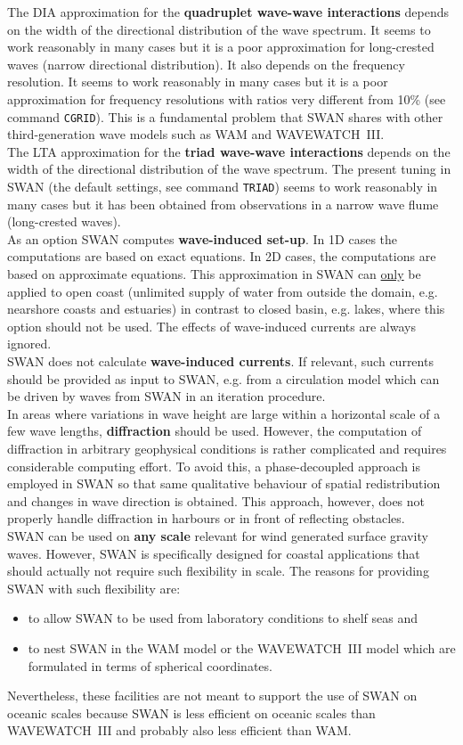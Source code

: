 \documentclass[12pt]{book}
\begin{document}
The DIA approximation for the {\bf quadruplet wave-wave interactions} depends on the width of the directional
distribution of the wave spectrum. It seems to work reasonably in many cases but it is a poor
approximation for long-crested waves (narrow directional distribution). It also depends on the frequency
resolution. It seems to work reasonably in many cases but it is a poor approximation for frequency
resolutions with ratios very different from 10\% (see command {\tt CGRID}). This is a fundamental problem
that SWAN shares with other third-generation wave models such as WAM and WAVEWATCH~III.
\\[2ex]
\noindent
The LTA approximation for the {\bf triad wave-wave interactions} depends on the width of the directional
distribution of the wave spectrum. The present tuning in SWAN (the default settings, see command
{\tt TRIAD}) seems to work reasonably in many cases but it has been obtained from observations in a narrow
wave flume (long-crested waves).
\\[2ex]
\noindent
As an option SWAN computes {\bf wave-induced set-up}. In 1D cases the computations are
based on exact equations. In 2D cases, the computations are based on approximate equations.
This approximation in SWAN can \underline{only} be applied to open coast (unlimited supply of water from outside
the domain, e.g. nearshore coasts and estuaries) in contrast to closed basin, e.g. lakes, where this option
should not be used.
The effects of wave-induced currents are always ignored.
\\[2ex]
\noindent
SWAN does not calculate {\bf wave-induced currents}. If relevant, such currents should be provided as input
to SWAN, e.g. from a circulation model which can be driven by waves from SWAN in an iteration procedure.
\\[2ex]
\noindent
In areas where variations in wave height are large within a horizontal scale of a few wave lengths,
{\bf diffraction} should be used. However, the computation of diffraction
in arbitrary geophysical conditions is rather complicated and requires considerable computing effort. To
avoid this, a phase-decoupled approach is employed in SWAN so that same qualitative behaviour of spatial redistribution
and changes in wave direction is obtained.
This approach, however, does not properly handle diffraction in harbours
or in front of reflecting obstacles.
\\[2ex]
\noindent
SWAN can be used on {\bf any scale} relevant for wind generated surface gravity waves. However, SWAN is
specifically designed for coastal applications that should actually not require such flexibility in scale. The
reasons for providing SWAN with such flexibility are:
\begin{itemize}
  \item to allow SWAN to be used from laboratory conditions to shelf seas and
  \item to nest SWAN in the WAM model or the WAVEWATCH~III model which are formulated in terms of
        spherical coordinates.
\end{itemize}
Nevertheless, these facilities are not meant to support the use of SWAN on oceanic scales because
SWAN is less efficient on oceanic scales than WAVEWATCH~III and probably also less efficient than WAM.
\end{document}
